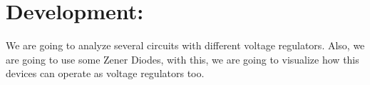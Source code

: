 \section{Development:}

We are going to analyze several circuits with different voltage regulators. Also, we are going to use some Zener Diodes, with this, we are going to visualize how this devices can operate as voltage regulators too.
